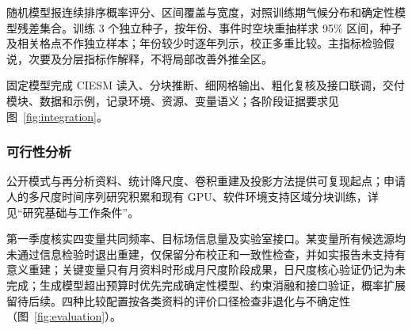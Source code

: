 随机模型报连续排序概率评分、区间覆盖与宽度，对照训练期气候分布和确定性模型残差集合。训练 3 个独立种子，按年份、事件时空块重抽样求 95\% 区间，种子及相关格点不作独立样本；年份较少时逐年列示，校正多重比较。主指标检验假说，次要及分层指标作解释，不将局部改善外推全区。

固定模型完成 CIESM 读入、分块推断、细网格输出、粗化复核及接口联调，交付模块、数据和示例，记录环境、资源、变量语义；各阶段证据要求见图~\ref{fig:integration}。

\subsubsection{可行性分析}

公开模式与再分析资料、统计降尺度、卷积重建及投影方法提供可复现起点；申请人的多尺度时间序列研究积累和现有 GPU、软件环境支持区域分块训练，详见“研究基础与工作条件”。

第一季度核实四变量共同频率、目标场信息量及实验室接口。某变量所有候选源均未通过信息检验时退出重建，仅保留分布校正和一致性检查，并如实报告未支持有意义重建；关键变量只有月资料时形成月尺度阶段成果，日尺度核心验证仍记为未完成；生成模型超出预算时优先完成确定性模型、约束消融和接口验证，概率扩展留待后续。四种比较配置按各类资料的评价口径检查非退化与不确定性（图~\ref{fig:evaluation}）。
